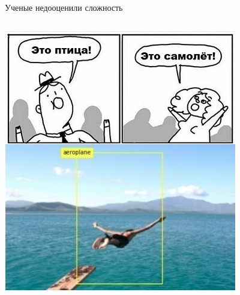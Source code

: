 \documentclass[aspectratio=169, professionalfonts]{beamer}
\begin{document}
\begin{frame}{Ученые недооценили сложность}
\begin{columns}
        \begin{column}{.33\linewidth}
            \includegraphics[width=\linewidth]{figures/fig14-error-3.jpg}
        \end{column}
    \end{columns}
\end{frame}
\end{document}
